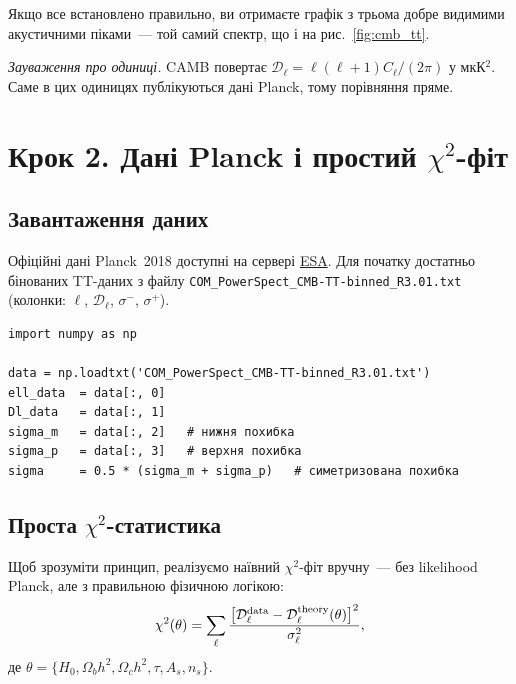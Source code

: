 \noindent
Якщо все встановлено правильно, ви отримаєте графік з трьома
добре видимими акустичними піками~--- той самий спектр, що
і на рис.~\ref{fig:cmb_tt}.

\textit{Зауваження про одиниці.} CAMB повертає
$\mathcal{D}_\ell = \ell(\ell+1)C_\ell/(2\pi)$ у мкК$^2$.
Саме в цих одиницях публікуються дані Planck, тому порівняння
пряме.

\section{Крок 2. Дані Planck і простий $\chi^2$-фіт}

\subsection{Завантаження даних}

Офіційні дані Planck~2018 доступні на сервері \href{https://pla.esac.esa.int/}{ESA}.
Для початку достатньо бінованих TT-даних з файлу
\texttt{COM\_PowerSpect\_CMB-TT-binned\_R3.01.txt}
(колонки: $\ell$, $\mathcal{D}_\ell$, $\sigma^-$, $\sigma^+$).

\begin{verbatim}
import numpy as np

data = np.loadtxt('COM_PowerSpect_CMB-TT-binned_R3.01.txt')
ell_data  = data[:, 0]
Dl_data   = data[:, 1]
sigma_m   = data[:, 2]   # нижня похибка
sigma_p   = data[:, 3]   # верхня похибка
sigma     = 0.5 * (sigma_m + sigma_p)   # симетризована похибка
\end{verbatim}

\subsection{Проста $\chi^2$-статистика}

Щоб зрозуміти принцип, реалізуємо наївний $\chi^2$-фіт вручну~---
без likelihood Planck, але з правильною фізичною логікою:
\begin{equation}\label{eq:chi2}
  \chi^2(\theta) = \sum_\ell
    \frac{\bigl[\mathcal{D}_\ell^{\rm data}
               - \mathcal{D}_\ell^{\rm theory}(\theta)\bigr]^2}
         {\sigma_\ell^2},
\end{equation}
де $\theta = \{H_0, \Omega_b h^2, \Omega_c h^2, \tau, A_s, n_s\}$.

